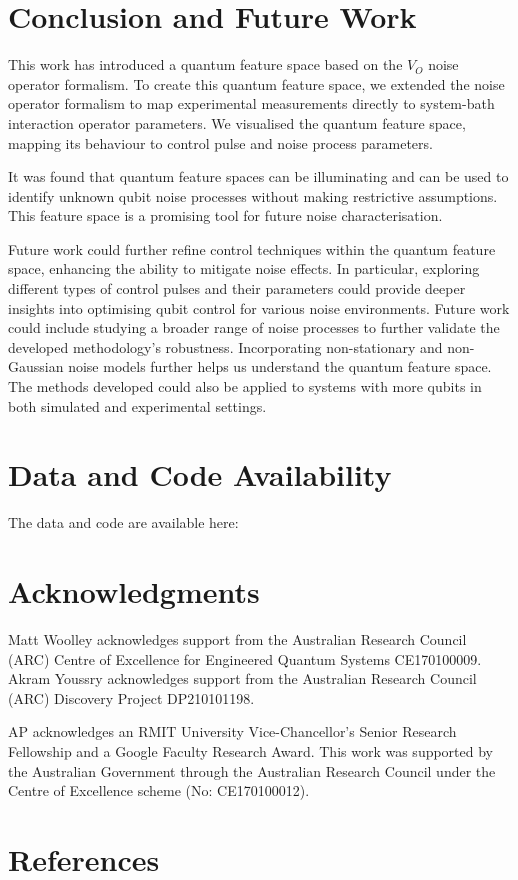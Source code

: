 \documentclass[12pt]{iopart}
\begin{document}
\section{Conclusion and Future Work \label{sec:conclusion_and_future_work}}
This work has introduced a quantum feature space based on the $V_O$ noise operator formalism. To create this quantum feature space, we extended the noise operator formalism to map experimental measurements directly to system-bath interaction operator parameters. We visualised the quantum feature space, mapping its behaviour to control pulse and noise process parameters.

It was found that quantum feature spaces can be illuminating and can be used to identify unknown qubit noise processes without making restrictive assumptions. This feature space is a promising tool for future noise characterisation.

Future work could further refine control techniques within the quantum feature space, enhancing the ability to mitigate noise effects. In particular, exploring different types of control pulses and their parameters could provide deeper insights into optimising qubit control for various noise environments. Future work could include studying a broader range of noise processes to further validate the developed methodology's robustness. Incorporating non-stationary and non-Gaussian noise models further helps us understand the quantum feature space. The methods developed could also be applied to systems with more qubits in both simulated and experimental settings.

\section{Data and Code Availability \label{sec:data_and_code_availability}}
The data and code are available here:

\section*{Acknowledgments \label{sec:acknowledgments}}
Matt Woolley acknowledges support from the Australian Research Council (ARC) Centre of Excellence for Engineered Quantum Systems CE170100009. Akram Youssry acknowledges support from the Australian Research Council (ARC) Discovery Project DP210101198.

AP acknowledges an RMIT University Vice-Chancellor's Senior Research Fellowship and a Google Faculty Research Award. This work was supported by the Australian Government through the Australian Research Council under the Centre of Excellence scheme (No: CE170100012).
\section{References}


\end{document}
